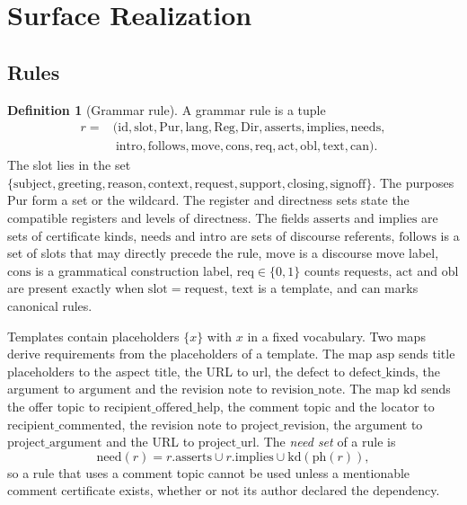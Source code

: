 \documentclass[11pt]{article}
\theoremstyle{definition}
\newtheorem{definition}[theorem]{Definition}
\theoremstyle{remark}
\newcommand{\need}{\mathrm{need}}
\begin{document}
\section{Surface Realization}\label{sec:real}

\subsection{Rules}

\begin{definition}[Grammar rule]\label{def:rule}
A grammar rule is a tuple
\[
\begin{aligned}r={}&(\mathrm{id},\mathrm{slot},\mathrm{Pur},\mathrm{lang},\mathrm{Reg},\mathrm{Dir},\mathrm{asserts},\mathrm{implies},\mathrm{needs},\\&\ \mathrm{intro},\mathrm{follows},\mathrm{move},\mathrm{cons},\mathrm{req},\mathrm{act},\mathrm{obl},\mathrm{text},\mathrm{can}).\end{aligned}
\]
 The slot lies in the set $\{\text{subject},\text{greeting},\text{reason},\text{context},\text{request},\text{support},\text{closing},\text{signoff}\}$. The purposes $\mathrm{Pur}$ form a set or the wildcard. The register and directness sets state the compatible registers and levels of directness. The fields $\mathrm{asserts}$ and $\mathrm{implies}$ are sets of certificate kinds, $\mathrm{needs}$ and $\mathrm{intro}$ are sets of discourse referents, $\mathrm{follows}$ is a set of slots that may directly precede the rule, $\mathrm{move}$ is a discourse move label, $\mathrm{cons}$ is a grammatical construction label, $\mathrm{req}\in\{0,1\}$ counts requests, $\mathrm{act}$ and $\mathrm{obl}$ are present exactly when $\mathrm{slot}=\text{request}$, $\mathrm{text}$ is a template, and $\mathrm{can}$ marks canonical rules.
\end{definition}

Templates contain placeholders $\{x\}$ with $x$ in a fixed vocabulary. Two maps derive requirements from the placeholders of a template. The map $\mathrm{asp}$ sends title placeholders to the aspect $\mathrm{title}$, the URL to $\mathrm{url}$, the defect to $\mathrm{defect\_kinds}$, the argument to $\mathrm{argument}$ and the revision note to $\mathrm{revision\_note}$. The map $\mathrm{kd}$ sends the offer topic to $\text{recipient\_offered\_help}$, the comment topic and the locator to $\text{recipient\_commented}$, the revision note to $\text{project\_revision}$, the argument to $\text{project\_argument}$ and the URL to $\text{project\_url}$. The \emph{need set} of a rule is
\[
\need(r)=r.\mathrm{asserts}\cup r.\mathrm{implies}\cup\mathrm{kd}(\mathrm{ph}(r)),
\]
so a rule that uses a comment topic cannot be used unless a mentionable comment certificate exists, whether or not its author declared the dependency.
\end{document}
